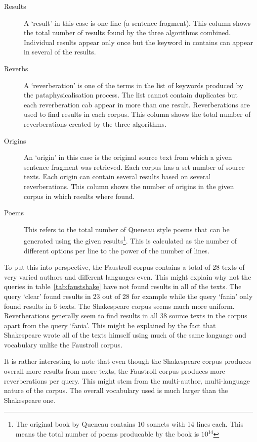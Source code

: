 \begin{description}
  \item[Results] A `result' in this case is one line (a sentence fragment). This column shows the total number of results found by the three algorithms combined. Individual results appear only once but the keyword in contains can appear in several of the results.
  \item[Reverbs] A `reverberation' is one of the terms in the list of keywords produced by the pataphysicalisation process. The list cannot contain duplicates but each reverberation cab appear in more than one result. Reverberations are used to find results in each corpus. This column shows the total number of reverberations created by the three algorithms.
  \item[Origins] An `origin' in this case is the original source text from which a given sentence fragment was retrieved. Each corpus has a set number of source texts. Each origin can contain several results based on several reverberations. This column shows the number of origins in the given corpus in which results where found.
  \item[Poems] This refers to the total number of Queneau style poems that can be generated using the given results\footnote{The original book by Queneau contains 10 sonnets with 14 lines each. This means the total number of poems producable by the book is $10^{14}$}. This is calculated as the number of different options per line to the power of the number of lines.
\end{description}

To put this into perspective, the Faustroll corpus contains a total of 28 texts of very varied authors and different languages even. This might explain why not the queries in table~\ref{tab:faustshake} have not found results in all of the texts. The query `clear' found results in 23 out of 28 for example while the query `fania' only found results in 6 texts. The Shakespeare corpus seems much more uniform. Reverberations generally seem to find results in all 38 source texts in the corpus apart from the query `fania'. This might be explained by the fact that Shakespeare wrote all of the texts himself using much of the same language and vocabulary unlike the Faustroll corpus. 

It is rather interesting to note that even though the Shakespeare corpus produces overall more results from more texts, the Faustroll corpus produces more reverberations per query. This might stem from the multi-author, multi-language nature of the corpus. The overall vocabulary used is much larger than the Shakespeare one.

